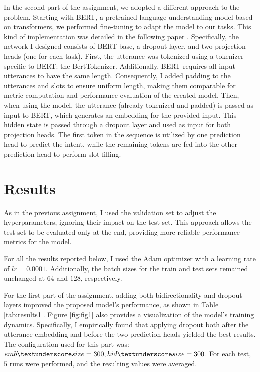 \documentclass[a4paper]{article}
\begin{document}
In the second part of the assignment, we adopted a different approach to the problem. Starting with BERT, a pretrained language understanding model based on transformers, we performed fine-tuning to adapt the model to our tasks.
This kind of implementation was detailed in the following paper \cite{BERT}. Specifically, the network I designed consists of BERT-base, a dropout layer, and two projection heads (one for each task).
First, the utterance was tokenized using a tokenizer specific to BERT: the BertTokenizer.
Additionally, BERT requires all input utterances to have the same length. Consequently, I added padding to the utterances and slots to ensure uniform length, making them comparable for metric computation and performance evaluation of the created model.
Then, when using the model, the utterance (already tokenized and padded) is passed as input to BERT, which generates an embedding for the provided input. This hidden state is passed through a dropout layer and used as input for both projection heads. The first token in the sequence is utilized by one prediction head to predict the intent, while the remaining tokens are fed into the other prediction head to perform slot filling.

\section{Results}
As in the previous assignment, I used the validation set to adjust the hyperparameters, ignoring their impact on the test set. This approach allows the test set to be evaluated only at the end, providing more reliable performance metrics for the model.

For all the results reported below, I used the Adam optimizer with a learning rate of \(lr = 0.0001\). Additionally, the batch sizes for the train and test sets remained unchanged at \(64\) and \(128\), respectively.

For the first part of the assignment, adding both bidirectionality and dropout layers improved the proposed model’s performance, as shown in Table \ref{tab:results1}. 
Figure \ref{fig:fig1} also provides a visualization of the model's training dynamics.
Specifically, I empirically found that applying dropout both after the utterance embedding and before the two prediction heads yielded the best results.
The configuration used for this part was: \(emb \textunderscore size=300, hid \textunderscore size=300\).
For each test, \(5\) runs were performed, and the resulting values were averaged.
\end{document}
